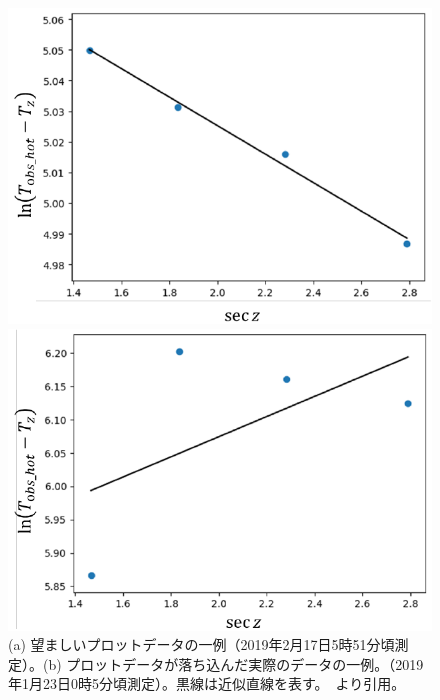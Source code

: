 \begin{figure}[htbp]
    \centering
    \begin{minipage}{0.41\linewidth}
        \centering
        \includegraphics[width=\linewidth]{master_thesis_contents/master_thesis_fig/optical_depth_good.pdf}
    \end{minipage}
    \begin{minipage}{0.45\linewidth}
        \centering
        \includegraphics[scale=0.6]{master_thesis_contents/master_thesis_fig/optical_depth_bad.pdf}
    \end{minipage}
    \caption{(a) 望ましいプロットデータの一例（2019年2月17日5時51分頃測定）。(b) プロットデータが落ち込んだ実際のデータの一例。（2019年1月23日0時5分頃測定）。黒線は近似直線を表す。~\cite{goto2021bachelor}より引用。}
    \label{fig:optical_depth_measurement_good_bad}
\end{figure}
